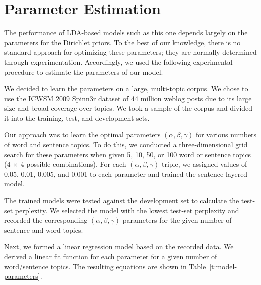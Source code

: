 \section{Parameter Estimation} \label{s:parameter-estimation} 

The performance of LDA-based models such as this one depends largely on the
parameters for the Dirichlet priors.  To the best of our knowledge, there is no
standard approach for optimizing these parameters; they are normally determined
through experimentation.  Accordingly, we used the following experimental
procedure to estimate the parameters of our model.

We decided to learn the parameters on a large, multi-topic corpus.  We chose to
use the ICWSM 2009 Spinn3r dataset of 44 million weblog posts
\cite{burton2009icwsm} due to its large size and broad coverage over topics.
We took a sample of the corpus and divided it into the training, test, and
development sets.

Our approach was to learn the optimal parameters $(\alpha, \beta, \gamma)$ for
various numbers of word and sentence topics.  To do this, we conducted a
three-dimensional grid search for these parameters when given 5, 10, 50, or 100
word or sentence topics (4 $\times$ 4 possible combinations).  For each
$(\alpha, \beta, \gamma)$ triple, we assigned values of 0.05, 0.01, 0.005, and
0.001 to each parameter and trained the sentence-layered model.  

The trained models were tested against the development set to calculate the
test-set perplexity.  We selected the model with the lowest test-set perplexity
and recorded the corresponding $(\alpha, \beta, \gamma)$ parameters for the
given number of sentence and word topics.

Next, we formed a linear regression model based on the recorded data.  We
derived a linear fit function for each parameter for a given number of
word/sentence topics.  The resulting equations are shown in
Table~\ref{t:model-parameters}.

